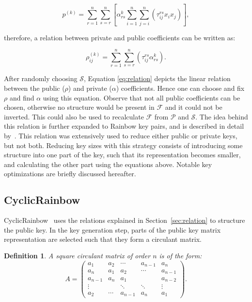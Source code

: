 \documentclass{ufsctex/ufsctex}
\newtheorem{definition}{Definition}
\begin{document}
\begin{equation}
p^{(k)} = \sum_{r=1}^n \sum_{s=r}^n
\left[
\alpha^{k}_{rs} \sum_{i=1}^{n}\sum_{j=i}^n \left( \tau^{rs}_{ij} x_i x_j \right)
\right],
\end{equation}

\noindent
therefore, a relation between private and public coefficients can be written as:

\begin{equation}\label{eq:relation}
\rho^{(k)}_{ij} = \sum_{r=1}^{n}\sum_{s=r}^n
\left( \tau^{rs}_{ij} \alpha^{k}_{rs} \right).
\end{equation}

After randomly choosing $\mathcal{S}$, Equation \ref{eq:relation} depicts the
linear relation between the public ($\rho$) and private ($\alpha$)
coefficients. Hence one can choose and fix $\rho$ and find $\alpha$ using this
equation. Observe that not all public coefficients can be chosen, otherwise no
structure would be present in $\mathcal{F}$ and it could not be inverted. This
could also be used to recalculate $\mathcal{F}$ from $\mathcal{P}$ and
$\mathcal{S}$. The idea behind this relation is further expanded to Rainbow key
pairs, and is described in detail by~\cite{petzoldt2011small}. This relation
was extensively used to reduce either public or private keys, but not both.
Reducing key sizes with this strategy consists of introducing some structure
into one part of the key, such that its representation becomes smaller, and
calculating the other part using the equations above. Notable key optimizations
are briefly discussed hereafter.

\subsection{CyclicRainbow}

CyclicRainbow~\cite{petzoldt2010cyclicrainbow} uses the relations explained in
Section~\ref{sec:relation} to structure the public key. In the key generation
step, parts of the public key matrix representation are selected such that they
form a circulant matrix.

\begin{definition}
A square circulant matrix of order $n$ is of the form:
\begin{equation}
A =
\begin{pmatrix}
a_1     & a_2    & \cdots  & a_{n-1} & a_n     \\
a_n     & a_1    & a_2     & \cdots  & a_{n-1} \\
a_{n-1} & a_n    & a_1     &         & a_{n-2} \\
\vdots  &        & \ddots  & \ddots  & \vdots  \\
a_2     & \cdots & a_{n-1} & a_n     & a_1
\end{pmatrix}.
\end{equation}
\end{definition}
\end{document}

